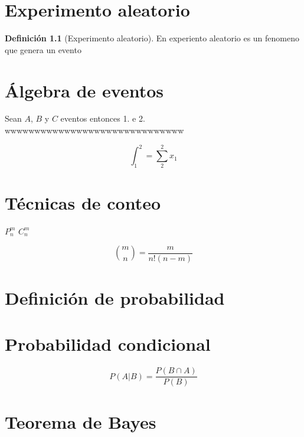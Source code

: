 \documentclass[10pt,]{krantz}
\theoremstyle{definition}
\newtheorem{definition}{Definición}[chapter]
\theoremstyle{definition}
\theoremstyle{definition}
\theoremstyle{definition}
\theoremstyle{remark}
\begin{document}
\hypertarget{experimento-aleatorio}{%
\chapter{Experimento aleatorio}\label{experimento-aleatorio}}

\begin{definition}[Experimento aleatorio]
\protect\hypertarget{def:unnamed-chunk-14}{}{\label{def:unnamed-chunk-14} {} }En experiento aleatorio es un fenomeno que genera un evento
\end{definition}

\hypertarget{uxe1lgebra-de-eventos}{%
\chapter{Álgebra de eventos}\label{uxe1lgebra-de-eventos}}

Sean \(A\), \(B\) y \(C\) eventos entonces
1. e
2. wwwwwwwwwwwwwwwwwwwwwwwwwwwwww

\[ \int_{1}^{2}=\sum_{2}^{2}x_1 \]

\hypertarget{tuxe9cnicas-de-conteo}{%
\chapter{Técnicas de conteo}\label{tuxe9cnicas-de-conteo}}

\(P_n^m\)
\(C_n^m\)

\[\binom{m}{n}=\frac{m}{n!(n-m)}\]

\hypertarget{definiciuxf3n-de-probabilidad}{%
\chapter{Definición de probabilidad}\label{definiciuxf3n-de-probabilidad}}

\hypertarget{probabilidad-condicional}{%
\chapter{Probabilidad condicional}\label{probabilidad-condicional}}

\[P(A|B)= \frac{P(B\cap A)}{P(B)}\]

\hypertarget{teorema-de-bayes}{%
\chapter{Teorema de Bayes}\label{teorema-de-bayes}}
\end{document}

